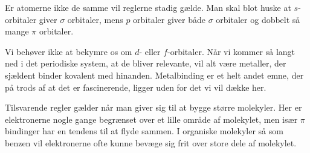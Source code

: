 \documentclass[../../Atom-ogMolekylefysik.tex]{subfiles}
\begin{document}
Er atomerne ikke de samme vil reglerne stadig gælde. Man skal blot huske at $s$-orbitaler giver $\sigma$ orbitaler, mens $p$ orbitaler giver både $\sigma$ orbitaler og dobbelt så mange $\pi$ orbitaler.

Vi behøver ikke at bekymre os om $d$- eller $f$-orbitaler. Når vi kommer så langt ned i det periodiske system, at de bliver relevante, vil alt være metaller, der sjældent binder kovalent med hinanden. Metalbinding er et helt andet emne, der på trods af at det er fascinerende, ligger uden for det vi vil dække her.

Tilsvarende regler gælder når man giver sig til at bygge større molekyler. Her er elektronerne nogle gange begrænset over et lille område af molekylet, men især $\pi$ bindinger har en tendens til at flyde sammen. I organiske molekyler så som benzen vil elektronerne ofte kunne bevæge sig frit over store dele af molekylet. 
\end{document}
